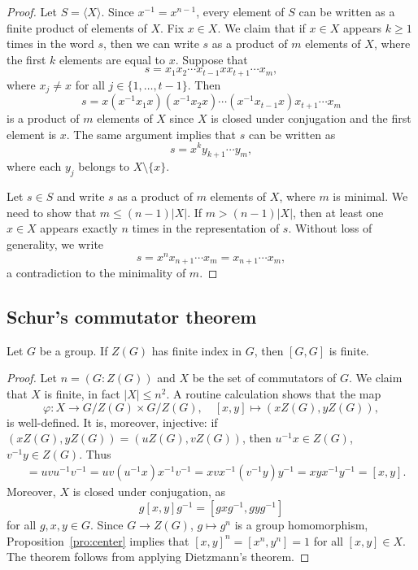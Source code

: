 \begin{proof}
	Let $S=\langle X\rangle$. Since $x^{-1}=x^{n-1}$, every element of $S$ can be 
	written as a finite product of elements of $X$. 
	Fix $x\in X$. We claim that if $x\in X$ appears $k\geq 1$ times 
	in the word $s$, then we can write $s$ as a product of $m$
	elements of $X$, where the first $k$ elements are equal to $x$. Suppose that 
	\[
	s=x_1x_2\cdots x_{t-1}xx_{t+1}\cdots x_m,
	\]
	where $x_j\ne x$ for all $j\in\{1,\dots,t-1\}$. Then 
	\[
		s=x(x^{-1}x_1x)(x^{-1}x_2x)\cdots (x^{-1}x_{t-1}x)x_{t+1}\cdots x_m
	\]
	is a product of $m$ elements of $X$ since $X$ is closed under conjugation and 
	the first element is $x$. The same argument implies that $s$
	can be written as 
	\[
		s=x^ky_{k+1}\cdots y_m,
	\]
	where each $y_j$ belongs to $X\setminus\{x\}$.

	Let $s\in S$ and write $s$ as a product of $m$ elements of 
	$X$, where $m$ is minimal. We need to show that 
	$m\leq (n-1)|X|$. 
	If $m>(n-1)|X|$, 
	then at least one $x\in X$ appears exactly $n$ 
	times in the representation of 
	$s$. Without loss of generality, we write 
	\[
		s=x^nx_{n+1}\cdots x_m=x_{n+1}\cdots x_m,
	\]
	a contradiction to the minimality of $m$. 
\end{proof}

\subsection{Schur's commutator theorem}

\begin{theorem}[Schur]
\label{thm:Schur}
	Let $G$ be a group. 
	If $Z(G)$ has finite index in $G$, then $[G,G]$ is finite.
\end{theorem}

\begin{proof}
	Let $n=(G:Z(G))$ and  
	$X$ be the set of commutators of $G$. We claim that $X$ is finite, in fact
	$|X|\leq n^2$.
	A routine calculation shows that the map 
	\[
		\varphi\colon X\to G/Z(G)\times G/Z(G),\quad [x,y]\mapsto (xZ(G),yZ(G)),
	\]
	is well-defined. It is, moreover, 
	injective: if $(xZ(G),yZ(G))=(uZ(G),vZ(G))$, then $u^{-1}x\in Z(G)$, 
	$v^{-1}y\in Z(G)$. Thus 
	\begin{align*}
		[u,v]&=uvu^{-1}v^{-1}=uv(u^{-1}x)x^{-1}v^{-1}=xvx^{-1}(v^{-1}y)y^{-1}=xyx^{-1}y^{-1}=[x,y].
	\end{align*}
	Moreover, $X$ is closed under conjugation, as 
	\[
		g[x,y]g^{-1}=[gxg^{-1},gyg^{-1}]
	\]
	for all $g,x,y\in G$. Since $G\to Z(G)$, $g\mapsto g^n$ is a group
	homomorphism, Proposition~\ref{pro:center} implies that $[x,y]^n=[x^n,y^n]=1$ for
	all $[x,y]\in X$.  The theorem follows from applying Dietzmann's theorem. 
\end{proof}

